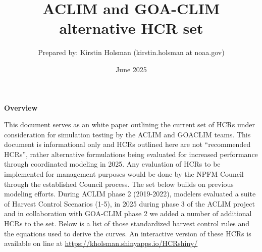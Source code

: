 \documentclass[
]{article}
\title{ACLIM and GOA-CLIM alternative HCR set}
\author{Prepared by: Kirstin Holsman (kirstin.holsman at noaa.gov)}
\date{June 2025}
\begin{document}
\maketitle

{
\setcounter{tocdepth}{3}
\tableofcontents
}
\textbf{Overview}

This document serves as an white paper outlining the current set of HCRs
under consideration for simulation testing by the ACLIM and GOACLIM
teams. This document is informational only and HCRs outlined here are
not ``recommended HCRs'', rather alternative formulations being
evaluated for increased performance through coordinated modeling in
2025. Any evaluation of HCRs to be implemented for management purposes
would be done by the NPFM Council through the established Council
process. The set below builds on previous modeling efforts. During ACLIM
phase 2 (2019-2022), modelers evaluated a suite of Harvest Control
Scenarios (1-5), in 2025 during phase 3 of the ACLIM project and in
collaboration with GOA-CLIM phase 2 we added a number of additional HCRs
to the set. Below is a list of those standardized harvest control rules
and the equations used to derive the curves. An interactive version of
these HCRs is available on line at
\url{https://kholsman.shinyapps.io/HCRshiny/}
\end{document}
